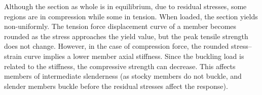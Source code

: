 \begin{itemize}
Although the section as whole is in equilibrium, due to residual stresses, some regions are in compression while some in tension. When loaded, the section yields non-uniformly. The tension force displacement curve of a member becomes rounded as the stress approaches the yield value, but the peak tensile strength does not change. However, in the case of compression force, the rounded stress--strain curve implies a lower member axial stiffness. Since the buckling load is related to the stiffness, the compressive strength can decrease. This affects members of intermediate slenderness (as stocky members do not buckle, and slender members buckle before the residual stresses affect the response).
\begin{figure}[H]
\centering
\end{figure}


\end{itemize}
